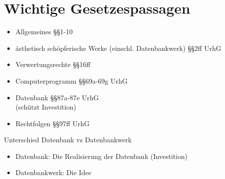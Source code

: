 \documentclass{scrreprt}
\begin{document}
\chapter{Wichtige Gesetzespassagen}
\begin{itemize}
\item Allgemeines \hfill §§1-10
\item ästhetisch schöpferische Werke (einschl. Datenbankwerk) \hfill §§2ff UrhG
\item Verwertungsrechte \hfill §§16ff
\item Computerprogramm \hfill §§69a-69g UrhG
\item Datenbank \hfill §§87a-87e UrhG\\
(schützt Investition)
\item Rechtfolgen \hfill §§97ff UrhG
\end{itemize}

Unterschied Datenbank vs Datenbankwerk
\begin{itemize}
\item Datenbank: Die Realisierung der Datenbank (Investition)
\item Datenbankwerk: Die Idee
\end{itemize}
\end{document}
